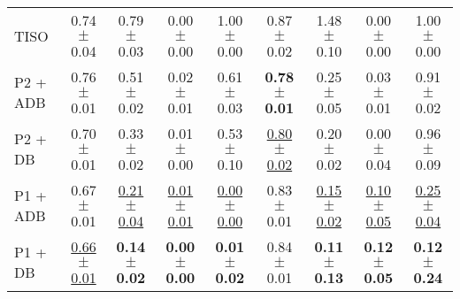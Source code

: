 \begin{table*}[t]
\begin{tabular}{@{}l|c!{\hspace{.5em}}c!{\hspace{.5em}}c!{\hspace{.5em}}c!{\hspace{.5em}}|c!{\hspace{.5em}}c!{\hspace{.5em}}c!{\hspace{.5em}}c@{}}
TISO & 0.74{\scriptsize$\pm$0.04} & 0.79{\scriptsize$\pm$0.03} & 0.00{\scriptsize$\pm$0.00} & 1.00{\scriptsize$\pm$0.00} & 0.87{\scriptsize$\pm$0.02} & 1.48{\scriptsize$\pm$0.10} & 0.00{\scriptsize$\pm$0.00} & 1.00{\scriptsize$\pm$0.00} \\
P2 + ADB & 0.76{\scriptsize$\pm$0.01} & 0.51{\scriptsize$\pm$0.02} & 0.02{\scriptsize$\pm$0.01} & 0.61{\scriptsize$\pm$0.03} & \textbf{0.78{\scriptsize$\pm$0.01}} & 0.25{\scriptsize$\pm$0.05} & 0.03{\scriptsize$\pm$0.01} & 0.91{\scriptsize$\pm$0.02} \\
P2 + DB & 0.70{\scriptsize$\pm$0.01} & 0.33{\scriptsize$\pm$0.02} & 0.01{\scriptsize$\pm$0.00} & 0.53{\scriptsize$\pm$0.10} & \underline{0.80{\scriptsize$\pm$0.02}} & 0.20{\scriptsize$\pm$0.02} & 0.00{\scriptsize$\pm$0.04} & 0.96{\scriptsize$\pm$0.09} \\
P1 + ADB & 0.67{\scriptsize$\pm$0.01} & \underline{0.21{\scriptsize$\pm$0.04}} & \underline{0.01{\scriptsize$\pm$0.01}} & \underline{0.00{\scriptsize$\pm$0.00}} & 0.83{\scriptsize$\pm$0.01} & \underline{0.15{\scriptsize$\pm$0.02}} & \underline{0.10{\scriptsize$\pm$0.05}} & \underline{0.25{\scriptsize$\pm$0.04}} \\
P1 + DB & \underline{0.66{\scriptsize$\pm$0.01}} & \textbf{0.14{\scriptsize$\pm$0.02}} & \textbf{0.00{\scriptsize$\pm$0.00}} & \textbf{0.01{\scriptsize$\pm$0.02}} & 0.84{\scriptsize$\pm$0.01} & \textbf{0.11{\scriptsize$\pm$0.13}} & \textbf{0.12{\scriptsize$\pm$0.05}} & \textbf{0.12{\scriptsize$\pm$0.24}} \\
\midrule[0.3pt]\toprule[1pt]
\end{tabular}
\end{table*}